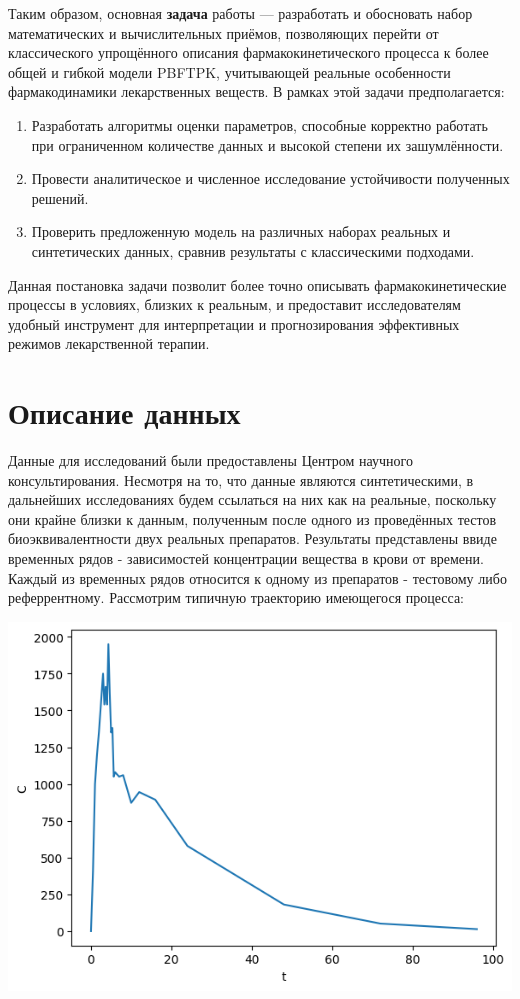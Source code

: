 \documentclass[oneside,senior,etd]{BYUPhys}
\begin{document}
Таким образом, основная \textbf{задача} работы --- разработать и обосновать набор математических и вычислительных приёмов, позволяющих перейти от классического упрощённого описания фармакокинетического процесса к более общей и гибкой модели PBFTPK, учитывающей реальные особенности фармакодинамики лекарственных веществ. В рамках этой задачи предполагается:

\begin{enumerate}
	\item Разработать алгоритмы оценки параметров, способные корректно работать при ограниченном количестве данных и высокой степени их зашумлённости.
	\item Провести аналитическое и численное исследование устойчивости полученных решений.
	\item Проверить предложенную модель на различных наборах реальных и синтетических данных, сравнив результаты с классическими подходами.
\end{enumerate}

Данная постановка задачи позволит более точно описывать фармакокинетические процессы в условиях, близких к реальным, и предоставит исследователям удобный инструмент для интерпретации и прогнозирования эффективных режимов лекарственной терапии.

\section{Описание данных}

Данные для исследований были предоставлены Центром научного консультирования. Несмотря на то, что данные являются синтетическими, в дальнейших исследованиях будем ссылаться на них как на реальные, поскольку они крайне близки к данным, полученным после одного из проведённых тестов биоэквивалентности двух реальных препаратов. Результаты представлены ввиде временных рядов - зависимостей концентрации вещества в крови от времени. Каждый из временных рядов относится к одному из препаратов - тестовому либо реферрентному. Рассмотрим типичную траекторию имеющегося процесса:

\includegraphics[]{sample.png}
\end{document}
